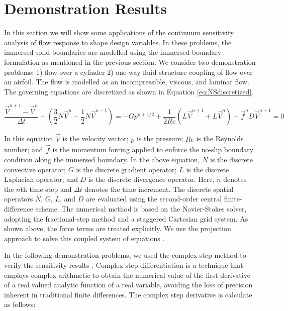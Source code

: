 \documentclass{aiaa-pretty}
\begin{document}
\section{Demonstration Results}
In this section we will show some applications of the continuum sensitivity analysis of flow response to shape design variables. In these problems, the immersed solid boundaries are modelled using the immersed boundary formulation as mentioned in the previous section. We consider two demonstration problems: 1) flow over a cylinder 2) one-way fluid-structure coupling of flow over an airfoil. The flow is modelled as an incompressible, viscous, and laminar flow. The governing equations are discretized as shown in Equation \eqref{eq:NSdiscretized}.

%
\begin{subequations}\label{eq:NSdiscretized}
\begin{equation}
	\frac{\vec{V}^{n+1} - \vec{V}^n}{\Delta t} + 
	\left( \frac{3}{2} N\vec{V}^n - \frac{1}{2} N\vec{V}^{n-1} \right) = 
	-G p^{n + 1/2} + 
	\frac{1}{2Re} \left( L \vec{V}^{n+1} + L \vec{V}^n \right) + 
	\vec{f}^n
\end{equation}
\begin{equation}
	D \vec{V}^{n+1} = 0
\end{equation}
\end{subequations}
%

In this equation $\vec{V}$ is the velocity vector; $p$ is the pressure; $Re$ is the Reynolds number; and $\vec{f}$ is the momentum forcing applied to enforce the no-slip boundary condition along the immersed boundary. In the above equation, $N$ is the discrete convective operator; $G$ is the discrete gradient operator; $L$ is the discrete Laplacian operator; and $D$ is the discrete divergence operator. Here, $n$ denotes the $n$th time step and $\Delta t$ denotes the time increment. The discrete spatial operators $N$, $G$, $L$, and $D$ are evaluated using the second-order central finite-difference scheme. The numerical method is based on the Navier-Stokes solver, adopting the fractional-step method and a staggered Cartesian grid system. As shown above, the force terms are treated explicitly. We use the projection approach to solve this coupled system of equations \cite{brown2001accurate}.

In the following demonstration problems, we used the complex step method to verify the sensitivity results \cite{martins2003complex}. Complex step differentiation is a technique that employs complex arithmetic to obtain the numerical value of the first derivative of a real valued analytic function of a real variable, avoiding the loss of precision inherent in traditional finite differences. The complex step derivative is calculate as follows:
\end{document}

